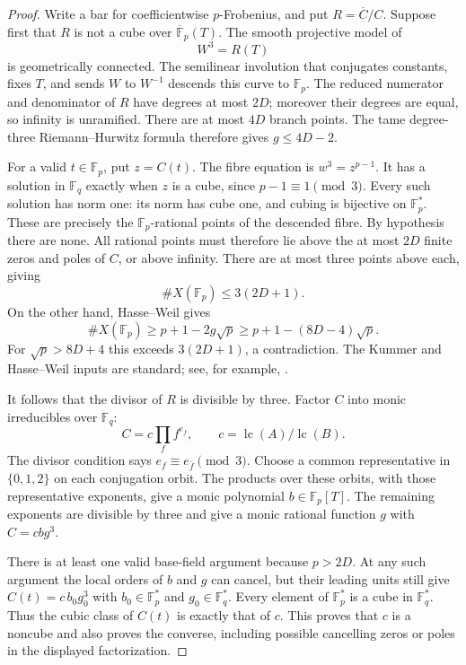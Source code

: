 \documentclass[11pt]{article}
\theoremstyle{definition}
\theoremstyle{remark}
\begin{document}
\begin{proof}
Write a bar for coefficientwise $p$-Frobenius, and put
$R=\overline C/C$.  Suppose first that $R$ is not a cube over
$\overline{\mathbb F}_p(T)$.  The smooth projective model of
\[
 W^3=R(T)
\]
is geometrically connected.  The semilinear involution that conjugates
constants, fixes $T$, and sends $W$ to $W^{-1}$ descends this
curve to $\mathbb F_p$.  The reduced numerator and denominator of
$R$ have degrees at most $2D$; moreover their degrees are equal,
so infinity is unramified.  There are at most $4D$ branch points.
The tame degree-three Riemann--Hurwitz formula therefore gives
$g\le4D-2$.

For a valid $t\in\mathbb F_p$, put $z=C(t)$.
The fibre equation is $w^3=z^{p-1}$.  It has a solution in
$\mathbb F_q$ exactly when $z$ is a cube, since $p-1\equiv1\pmod3$.
Every such solution has norm one: its norm has cube one, and cubing
is bijective on $\mathbb F_p^*$.  These are precisely the
$\mathbb F_p$-rational points of the descended fibre.  By hypothesis
there are none.  All rational points must therefore lie above the
at most $2D$ finite zeros and poles of $C$, or above infinity.
There are at most three points above each, giving
\[
 \#X(\mathbb F_p)\le3(2D+1).
\]
On the other hand, Hasse--Weil gives
\[
 \#X(\mathbb F_p)\ge p+1-2g\sqrt p
                    \ge p+1-(8D-4)\sqrt p.
\]
For $\sqrt p>8D+4$ this exceeds $3(2D+1)$, a contradiction.
The Kummer and Hasse--Weil inputs are standard; see, for example,
\cite[Section~1.1, Theorems~1.1--1.2]{BartoliEtAl2024}.

It follows that the divisor of $R$ is divisible by three.
Factor $C$ into monic irreducibles over $\mathbb F_q$:
\[
 C=c\prod_f f^{e_f},\qquad
 c=\operatorname{lc}(A)/\operatorname{lc}(B).
\]
The divisor condition says $e_f\equiv e_{\bar f}\pmod3$.
Choose a common representative in $\{0,1,2\}$ on each conjugation
orbit.  The products over these orbits, with those representative
exponents, give a monic polynomial $b\in\mathbb F_p[T]$.
The remaining exponents are divisible by three and give a monic
rational function $g$ with $C=cbg^3$.

There is at least one valid base-field argument because $p>2D$.
At any such argument the local orders of $b$ and $g$ can cancel,
but their leading units still give
$C(t)=c\,b_0g_0^3$ with $b_0\in\mathbb F_p^*$ and
$g_0\in\mathbb F_q^*$.  Every element of $\mathbb F_p^*$ is a
cube in $\mathbb F_q^*$.  Thus the cubic class of $C(t)$ is exactly
that of $c$.  This proves that $c$ is a noncube and also proves
the converse, including possible cancelling zeros or poles in the
displayed factorization.
\end{proof}
\end{document}
